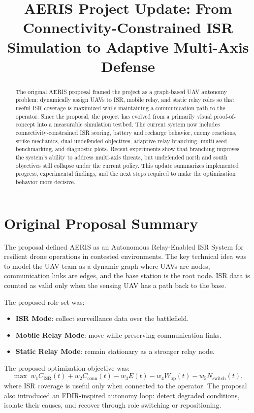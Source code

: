 \documentclass[conference]{IEEEtran}
\title{AERIS Project Update: From Connectivity-Constrained ISR Simulation to Adaptive Multi-Axis Defense}
\author{
\IEEEauthorblockN{Jeewoo Choi}
\IEEEauthorblockA{
Stanford University\\
jchoi23@stanford.edu
}
}
\begin{document}
\maketitle

\begin{abstract}
The original AERIS proposal framed the project as a graph-based UAV autonomy
problem: dynamically assign UAVs to ISR, mobile relay, and static relay roles so
that useful ISR coverage is maximized while maintaining a communication path to
the operator. Since the proposal, the project has evolved from a primarily
visual proof-of-concept into a measurable simulation testbed. The current system
now includes connectivity-constrained ISR scoring, battery and recharge behavior,
enemy reactions, strike mechanics, dual undefended objectives, adaptive relay
branching, multi-seed benchmarking, and diagnostic plots. Recent experiments
show that branching improves the system's ability to address multi-axis threats,
but undefended north and south objectives still collapse under the current
policy. This update summarizes implemented progress, experimental findings, and
the next steps required to make the optimization behavior more decisive.
\end{abstract}

\section{Original Proposal Summary}
The proposal defined AERIS as an Autonomous Relay-Enabled ISR System for
resilient drone operations in contested environments. The key technical idea was
to model the UAV team as a dynamic graph where UAVs are nodes, communication
links are edges, and the base station is the root node. ISR data is counted as
valid only when the sensing UAV has a path back to the base.

The proposed role set was:
\begin{itemize}
    \item \textbf{ISR Mode}: collect surveillance data over the battlefield.
    \item \textbf{Mobile Relay Mode}: move while preserving communication links.
    \item \textbf{Static Relay Mode}: remain stationary as a stronger relay node.
\end{itemize}

The proposed optimization objective was:
\begin{equation}
\max \; w_1 C_{\text{ISR}}(t) + w_2 C_{\text{conn}}(t)
- w_3 E(t) - w_4 W_{\text{op}}(t) - w_5 N_{\text{switch}}(t),
\end{equation}
where ISR coverage is useful only when connected to the operator. The proposal
also introduced an FDIR-inspired autonomy loop: detect degraded conditions,
isolate their causes, and recover through role switching or repositioning.
\end{document}
